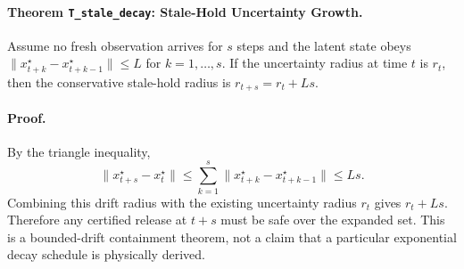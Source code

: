 \paragraph{Theorem \texttt{T\_stale\_decay}: Stale-Hold Uncertainty Growth.}
Assume no fresh observation arrives for \(s\) steps and the latent state obeys
\(\|x^\star_{t+k}-x^\star_{t+k-1}\|\le L\) for \(k=1,\ldots,s\). If the
uncertainty radius at time \(t\) is \(r_t\), then the conservative stale-hold
radius is \(r_{t+s}=r_t+Ls\).

\paragraph{Proof.}
By the triangle inequality,
\[
\|x^\star_{t+s}-x^\star_t\|
\le \sum_{k=1}^s \|x^\star_{t+k}-x^\star_{t+k-1}\|
\le Ls .
\]
Combining this drift radius with the existing uncertainty radius \(r_t\) gives
\(r_t+Ls\). Therefore any certified release at \(t+s\) must be safe over the
expanded set. This is a bounded-drift containment theorem, not a claim that a
particular exponential decay schedule is physically derived.
